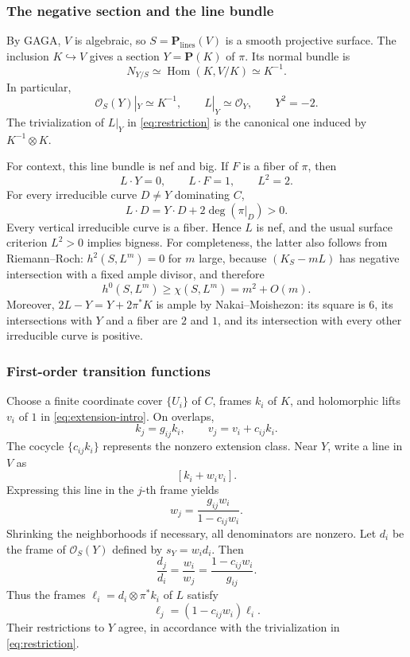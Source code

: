 \documentclass[11pt]{amsart}
\theoremstyle{definition}
\theoremstyle{remark}
\numberwithin{equation}{section}
\newcommand{\PP}{\mathbf P}
\newcommand{\OO}{\mathcal O}
\begin{document}
\subsubsection{The negative section and the line bundle}

By GAGA, $V$ is algebraic, so $S=\PP_{\mathrm{lines}}(V)$ is a smooth
projective surface. The inclusion $K\hookrightarrow V$ gives a section
$Y=\PP(K)$ of $\pi$. Its normal bundle is
\begin{equation}\label{eq:normal}
 N_{Y/S}\simeq\operatorname{Hom}(K,V/K)\simeq K^{-1}.
\end{equation}
In particular,
\begin{equation}\label{eq:restriction}
 \OO_S(Y)|_Y\simeq K^{-1},\qquad
 L|_Y\simeq\OO_Y,\qquad Y^2=-2.
\end{equation}
The trivialization of $L|_Y$ in \eqref{eq:restriction} is the canonical
one induced by $K^{-1}\otimes K$.

For context, this line bundle is nef and big. If $F$ is a fiber of $\pi$,
then
\[
 L\cdot Y=0,\qquad L\cdot F=1,\qquad L^2=2.
\]
For every irreducible curve $D\ne Y$ dominating $C$,
\[
 L\cdot D=Y\cdot D+2\deg(\pi|_D)>0.
\]
Every vertical irreducible curve is a fiber. Hence $L$ is nef, and the
usual surface criterion $L^2>0$ implies bigness. For completeness, the
latter also follows from Riemann--Roch: $h^2(S,L^m)=0$ for $m$ large,
because $(K_S-mL)$ has negative intersection with a fixed ample divisor,
and therefore
\[
 h^0(S,L^m)\ge\chi(S,L^m)=m^2+O(m).
\]
Moreover, $2L-Y=Y+2\pi^*K$ is ample by Nakai--Moishezon: its square is
$6$, its intersections with $Y$ and a fiber are $2$ and $1$, and its
intersection with every other irreducible curve is positive.

\subsubsection{First-order transition functions}

Choose a finite coordinate cover $\{U_i\}$ of $C$, frames $k_i$ of $K$,
and holomorphic lifts $v_i$ of $1$ in \eqref{eq:extension-intro}.
On overlaps,
\begin{equation}\label{eq:vector-transitions}
 k_j=g_{ij}k_i,\qquad v_j=v_i+c_{ij}k_i.
\end{equation}
The cocycle $\{c_{ij}k_i\}$ represents the nonzero extension class.
Near $Y$, write a line in $V$ as
\[
 [k_i+w_iv_i].
\]
Expressing this line in the $j$-th frame yields
\begin{equation}\label{eq:normal-transition}
 w_j=\frac{g_{ij}w_i}{1-c_{ij}w_i}.
\end{equation}
Shrinking the neighborhoods if necessary, all denominators are nonzero.
Let $d_i$ be the frame of $\OO_S(Y)$ defined by $s_Y=w_id_i$. Then
\[
 \frac{d_j}{d_i}=\frac{w_i}{w_j}
 =\frac{1-c_{ij}w_i}{g_{ij}}.
\]
Thus the frames $\ell_i=d_i\otimes\pi^*k_i$ of $L$ satisfy
\begin{equation}\label{eq:L-transition}
 \ell_j=(1-c_{ij}w_i)\ell_i.
\end{equation}
Their restrictions to $Y$ agree, in accordance with the trivialization
in \eqref{eq:restriction}.
\end{document}
